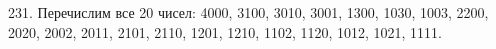 231. Перечислим все 20 чисел: 4000, 3100, 3010, 3001, 1300, 1030, 1003, 2200, 2020, 2002, 2011, 2101, 2110, 1201, 1210, 1102, 1120, 1012, 1021, 1111.\\
